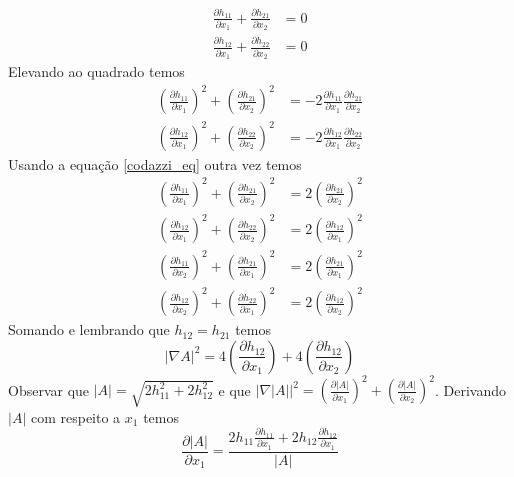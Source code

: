 \begin{demonstracao}
	\begin{align*}
		\frac{\partial h_{11}}{\partial x_1} + \frac{\partial h_{21}}{\partial x_2} &= 0\\
		\frac{\partial h_{12}}{\partial x_1} + \frac{\partial h_{22}}{\partial x_2} &= 0
	\end{align*}	
	Elevando ao quadrado temos
	\begin{align*}
		\left( \frac{\partial h_{11}}{\partial x_1} \right)^2 + \left( \frac{\partial h_{21}}{\partial x_2} \right)^2  &= - 2 \frac{\partial h_{11}}{\partial x_1} \frac{\partial h_{21}}{\partial x_2}  \\
		\left( \frac{\partial h_{12}}{\partial x_1} \right)^2 + \left( \frac{\partial h_{22}}{\partial x_2} \right)^2 &= - 2 \frac{\partial h_{12}}{\partial x_1} \frac{\partial h_{22}}{\partial x_2}
	\end{align*}	
	Usando a equação \eqref{codazzi_eq} outra vez temos
	\begin{align*}
		\left( \frac{\partial h_{11}}{\partial x_1} \right)^2 + \left( \frac{\partial h_{21}}{\partial x_2} \right)^2  &=  2  \left( \frac{\partial h_{21}}{\partial x_2} \right)^2  \\
		\left( \frac{\partial h_{12}}{\partial x_1} \right)^2 + \left( \frac{\partial h_{22}}{\partial x_2} \right)^2 &=  2 \left( \frac{\partial h_{12}}{\partial x_1} \right)^2\\
		\left( \frac{\partial h_{11}}{\partial x_2} \right)^2 + \left( \frac{\partial h_{21}}{\partial x_1} \right)^2  &= 2 \left( \frac{\partial h_{21}}{\partial x_1} \right)^2\\
		\left( \frac{\partial h_{12}}{\partial x_2} \right)^2 + \left( \frac{\partial h_{22}}{\partial x_1} \right)^2 &=  2 \left( \frac{\partial h_{12}}{\partial x_2} \right)^2  
	\end{align*}	
	Somando e lembrando que $h_{12} = h_{21}$ temos
	\begin{equation*}
		| \nabla A |^2 = 4 \left( \frac{\partial h_{12}}{\partial x_1} \right) + 4 \left( \frac{\partial h_{12}}{\partial x_2} \right)
	\end{equation*}	
	Observar que $ |A| = \sqrt{2 h_{11}^2 + 2 h_{12}^2} $ e que $ | \nabla |A| |^2 = \left( \frac{\partial |A|}{\partial x_1} \right)^2 + \left( \frac{\partial |A|}{\partial x_2} \right)^2 $. Derivando $ |A| $ com respeito a $x_1$ temos
	\begin{equation*}
		\frac{\partial |A|}{\partial x_1} = \frac{2 h_{11} \frac{\partial h_{11}}{\partial x_1} + 2 h_{12} \frac{\partial h_{12}}{\partial x_1}}{|A|}

\end{equation*}
\end{demonstracao}
